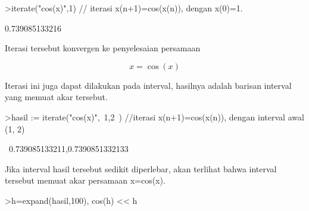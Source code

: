 \documentclass[12pt,arial,letterpaper]{book}
\begin{document}
\begin{eulernootebook}
\begin{eulercomment}
\begin{eulercomment}
\begin{eulernootebook}
\begin{eulercomment}
\begin{eulercomment}
\begin{eulercomment}
\begin{eulercomment}
\begin{eulercomment}
\begin{eulercomment}
\begin{eulernotebook}
\begin{eulercomment}
\begin{eulercomment}
\begin{eulercomment}
\begin{eulercomment}
\begin{eulercomment}
\begin{eulercomment}
\begin{eulercomment}
\begin{eulercomment}
\begin{eulercomment}
\begin{eulercomment}
\begin{eulercomment}
\begin{eulercomment}
\begin{eulercomment}
\begin{eulercomment}
\begin{eulercomment}
\begin{eulercomment}
\begin{eulercomment}
\begin{eulercomment}
\begin{eulercomment}
\begin{eulercomment}
\begin{eulercomment}
\begin{eulercomment}
\begin{eulercomment}
\begin{eulercomment}
\begin{eulercomment}
\begin{eulercomment}
\begin{eulercomment}
\begin{eulercomment}
\begin{eulercomment}
\begin{eulercomment}
\begin{eulercomment}
\end{eulercomment}
\begin{eulerprompt}
>iterate("cos(x)",1) // iterasi x(n+1)=cos(x(n)), dengan x(0)=1.
\end{eulerprompt}
\begin{euleroutput}
  0.739085133216
\end{euleroutput}
\begin{eulercomment}
Iterasi tersebut konvergen ke penyelesaian persamaan

\end{eulercomment}
\begin{eulerformula}
\[
x = \cos(x)
\]
\end{eulerformula}
\begin{eulercomment}
Iterasi ini juga dapat dilakukan pada interval, hasilnya adalah
barisan interval yang memuat akar tersebut.
\end{eulercomment}
\begin{eulerprompt}
>hasil := iterate("cos(x)",~1,2~) //iterasi x(n+1)=cos(x(n)), dengan interval awal (1, 2)
\end{eulerprompt}
\begin{euleroutput}
  ~0.739085133211,0.7390851332133~
\end{euleroutput}
\begin{eulercomment}
Jika interval hasil tersebut sedikit diperlebar, akan terlihat bahwa
interval tersebut memuat akar persamaan x=cos(x).
\end{eulercomment}
\begin{eulerprompt}
>h=expand(hasil,100), cos(h) << h
\end{eulerprompt}

\end{eulercomment}
\end{eulercomment}
\end{eulercomment}
\end{eulercomment}
\end{eulercomment}
\end{eulercomment}
\end{eulercomment}
\end{eulercomment}
\end{eulercomment}
\end{eulercomment}
\end{eulercomment}
\end{eulercomment}
\end{eulercomment}
\end{eulercomment}
\end{eulercomment}
\end{eulercomment}
\end{eulercomment}
\end{eulercomment}
\end{eulercomment}
\end{eulercomment}
\end{eulercomment}
\end{eulercomment}
\end{eulercomment}
\end{eulercomment}
\end{eulercomment}
\end{eulercomment}
\end{eulercomment}
\end{eulercomment}
\end{eulercomment}
\end{eulercomment}
\end{eulernotebook}
\end{eulercomment}
\end{eulercomment}
\end{eulercomment}
\end{eulercomment}
\end{eulercomment}
\end{eulercomment}
\end{eulernootebook}
\end{eulercomment}
\end{eulercomment}
\end{eulernootebook}
\end{document}
